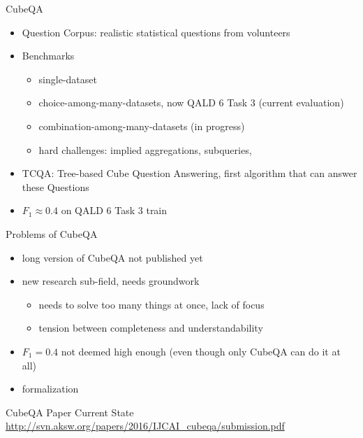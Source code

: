 \documentclass[14pt]{beamer}
\begin{document}
\begin{frame}{CubeQA}
\begin{itemize}
\item Question Corpus: realistic statistical questions from volunteers
\item Benchmarks
\begin{itemize}
\item single-dataset
\item choice-among-many-datasets, now QALD 6 Task 3 (current evaluation)
\item combination-among-many-datasets (in progress)
\item hard challenges: implied aggregations, subqueries,  
\end{itemize}
\item TCQA: Tree-based Cube Question Answering, first algorithm that can answer these Questions
\item $F_1 \approx 0.4$ on QALD 6 Task 3 train
\end{itemize}
\end{frame}

\begin{frame}{Problems of CubeQA}
\begin{itemize}
\item long version of CubeQA not published yet
\item new research sub-field, needs groundwork
\begin{itemize}
\item needs to solve too many things at once, lack of focus
\item tension between completeness and understandability 
\end{itemize}
\item $F_1=0.4$ not deemed high enough (even though only CubeQA can do it at all)
\item formalization  
\end{itemize}
\end{frame}

\begin{frame}{CubeQA Paper Current State}
\url{http://svn.aksw.org/papers/2016/IJCAI\_cubeqa/submission.pdf}
\end{frame}
\end{document}

